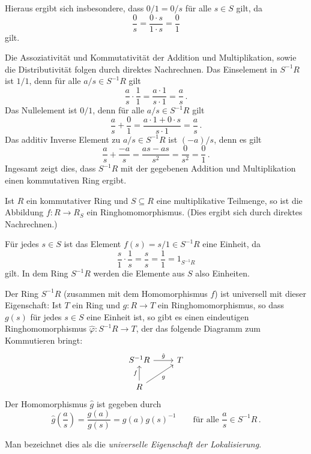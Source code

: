 Hieraus ergibt sich insbesondere, dass $0/1 = 0/s$ für alle $s \in S$ gilt, da
\[
    \frac{0}{s}
  = \frac{0 \cdot s}{1 \cdot s}
  = \frac{0}{1}
\]
gilt.

Die Assoziativität und Kommutativität der Addition und Multiplikation, sowie die Distributivität folgen durch direktes Nachrechnen.
Das Einselement in $S^{-1} R$ ist $1/1$, denn für alle $a/s \in S^{-1} R$ gilt
\[
    \frac{a}{s} \cdot \frac{1}{1}
  = \frac{a \cdot 1}{s \cdot 1}
  = \frac{a}{s} \,.
\]
Das Nullelement ist $0/1$, denn für alle $a/s \in S^{-1} R$ gilt
\[
    \frac{a}{s} + \frac{0}{1}
  = \frac{a \cdot 1 + 0 \cdot s}{s \cdot 1}
  = \frac{a}{s} \,.
\]
Das additiv Inverse Element zu $a/s \in S^{-1} R$ ist $(-a)/s$, denn es gilt
\[
    \frac{a}{s} + \frac{-a}{s}
  = \frac{a s - a s}{s^2}
  = \frac{0}{s^2}
  = \frac{0}{1} \,.
\]
Ingesamt zeigt dies, dass $S^{-1} R$ mit der gegebenen Addition und Multiplikation einen kommutativen Ring ergibt.

\begin{remark}
  \label{remark: universal property of localization}
  Ist $R$ ein kommutativer Ring und $S \subseteq R$ eine multiplikative Teilmenge, so ist die Abbildung $f \colon R \to R_S$ ein Ringhomomorphismus.
  (Dies ergibt sich durch direktes Nachrechnen.)
  
  Für jedes $s \in S$ ist das Element $f(s) = s/1 \in S^{-1} R$ eine Einheit, da
  \[
      \frac{s}{1} \cdot \frac{1}{s}
    = \frac{s}{s}
    = \frac{1}{1}
    = 1_{S^{-1} R}
  \]
  gilt.
  In dem Ring $S^{-1} R$ werden die Elemente aus $S$ also Einheiten.
  
  Der Ring $S^{-1} R$ (zusammen mit dem Homomorphismus $f$) ist universell mit dieser Eigenschaft:
  Ist $T$ ein Ring und $g \colon R \to T$ ein Ringhomomorphismus, so dass $g(s)$ für jedes $s \in S$ eine Einheit ist, so gibt es einen eindeutigen Ringhomomorphismus $\hat{\varphi} \colon S^{-1} R \to T$, der das folgende Diagramm zum Kommutieren bringt:
  \[
    \begin{tikzcd}
        S^{-1} R
        \arrow{r}{\hat{g}}
      & T
      \\
        R
        \arrow{u}{f}
        \arrow[swap]{ru}{g}
      & {}
    \end{tikzcd}
  \]
  Der Homomorphismus $\hat{g}$ ist gegeben durch
  \[
      \hat{g}\left( \frac{a}{s} \right)
    = \frac{g(a)}{g(s)}
    = g(a) g(s)^{-1}
    \qquad
    \text{für alle $\frac{a}{s} \in S^{-1} R$} \,.
  \]
  
  Man bezeichnet dies als die \emph{universelle Eigenschaft der Lokalisierung}.
\end{remark}

